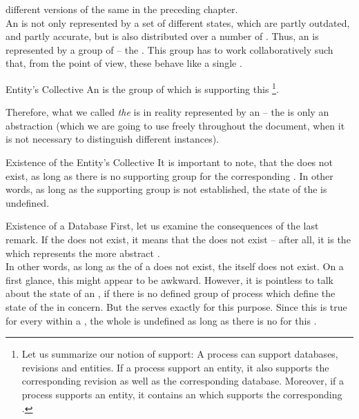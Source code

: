 \documentclass[a4paper, 12pt]{book}
\begin{document}
different versions of the same  in the preceding chapter.\\
%
An  is not only represented by a set of different states,
which are partly outdated, and partly accurate, but is also
distributed over a number of .
Thus, an  is represented by a group of  -- the
. This group has to work collaboratively such that,
from the  point of view, these  behave like
a single . 
%
\begin{definition*}{Entity's Collective}
  An  is the group of  which
  is supporting this \footnote{Let us summarize our notion
  of support: A process can support databases, revisions and
  entities. If a process support an entity, it also supports the
  corresponding revision as well as the corresponding
  database. Moreover, if a process supports an entity, it contains an
   which supports the corresponding .}. 
\end{definition*}
%
Therefore, what we called \emph{the}  is in reality represented by
an  -- the  is only an abstraction (which
we are going to use freely throughout the document, when it is not necessary
to distinguish different instances). 
%
\begin{remark*}{Existence of the Entity's Collective}
  It is important to note, that the  does not
  exist, as long as there is no supporting group for the corresponding
  . 
  In other words, as long as the supporting group is not established,
  the state of the  is undefined. 
\end{remark*}
%
\begin{remark*}{Existence of a Database}
  First, let us examine the consequences of the last remark. If the
   does not exist, it means that the
   does not exist -- after all, it is the  which represents the more abstract .\\
  In other words, as long as the  of a
   does not exist, the  itself does not
  exist. 
  On a first glance, this might appear to be awkward. However, it is
  pointless to talk about the state of an , if there is no
  defined group of process which define the state of the 
  in concern. But the  serves exactly for this
  purpose. Since this is true for every  within a
  , the whole  is undefined as long as there
  is no  for this .
\end{remark*}
\end{document}
